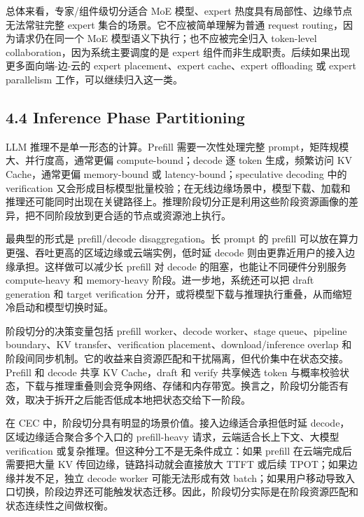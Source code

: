 \documentclass[a4paper,10pt]{ctexart}
\begin{document}
总体来看，专家/组件级切分适合 MoE 模型、expert 热度具有局部性、边缘节点无法常驻完整 expert 集合的场景。它不应被简单理解为普通 request routing，因为请求仍在同一个 MoE 模型语义下执行；也不应被完全归入 token-level collaboration，因为系统主要调度的是 expert 组件而非生成职责。后续如果出现更多面向端-边-云的 expert placement、expert cache、expert offloading 或 expert parallelism 工作，可以继续归入这一类。


\subsection*{4.4 Inference Phase Partitioning}

LLM 推理不是单一形态的计算。Prefill 需要一次性处理完整 prompt，矩阵规模大、并行度高，通常更偏 compute-bound；decode 逐 token 生成，频繁访问 KV Cache，通常更偏 memory-bound 或 latency-bound；speculative decoding 中的 verification 又会形成目标模型批量校验；在无线边缘场景中，模型下载、加载和推理还可能同时出现在关键路径上。推理阶段切分正是利用这些阶段资源画像的差异，把不同阶段放到更合适的节点或资源池上执行。


最典型的形式是 prefill/decode disaggregation。长 prompt 的 prefill 可以放在算力更强、吞吐更高的区域边缘或云端实例，低时延 decode 则由更靠近用户的接入边缘承担。这样做可以减少长 prefill 对 decode 的阻塞，也能让不同硬件分别服务 compute-heavy 和 memory-heavy 阶段。进一步地，系统还可以把 draft generation 和 target verification 分开，或将模型下载与推理执行重叠，从而缩短冷启动和模型切换时延。


阶段切分的决策变量包括 prefill worker、decode worker、stage queue、pipeline boundary、KV transfer、verification placement、download/inference overlap 和阶段间同步机制。它的收益来自资源匹配和干扰隔离，但代价集中在状态交接。Prefill 和 decode 共享 KV Cache，draft 和 verify 共享候选 token 与概率校验状态，下载与推理重叠则会竞争网络、存储和内存带宽。换言之，阶段切分能否有效，取决于拆开之后能否低成本地把状态交给下一阶段。


在 CEC 中，阶段切分具有明显的场景价值。接入边缘适合承担低时延 decode，区域边缘适合聚合多个入口的 prefill-heavy 请求，云端适合长上下文、大模型 verification 或复杂推理。但这种分工不是无条件成立：如果 prefill 在云端完成后需要把大量 KV 传回边缘，链路抖动就会直接放大 TTFT 或后续 TPOT；如果边缘并发不足，独立 decode worker 可能无法形成有效 batch；如果用户移动导致入口切换，阶段边界还可能触发状态迁移。因此，阶段切分实际是在阶段资源匹配和状态连续性之间做权衡。
\end{document}
